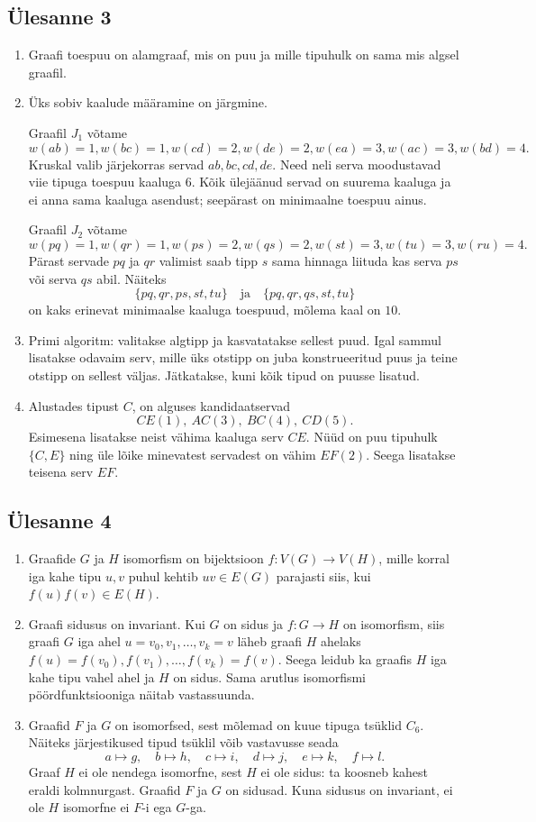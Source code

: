 \documentclass[11pt,a4paper]{article}
\newcommand{\yl}[1]{\subsection*{Ülesanne #1}}
\begin{document}
\yl{3}
\begin{enumerate}[label=\alph*.]
\item Graafi toespuu on alamgraaf, mis on puu ja mille tipuhulk on sama mis algsel graafil.
\item Üks sobiv kaalude määramine on järgmine.

Graafil $J_1$ võtame
\[
 w(ab)=1,
 w(bc)=1,
 w(cd)=2,
 w(de)=2,
 w(ea)=3,
 w(ac)=3,
 w(bd)=4.
\]
Kruskal valib järjekorras servad $ab,bc,cd,de$. Need neli serva moodustavad viie tipuga toespuu kaaluga $6$. Kõik ülejäänud servad on suurema kaaluga ja ei anna sama kaaluga asendust; seepärast on minimaalne toespuu ainus.

Graafil $J_2$ võtame
\[
 w(pq)=1,
 w(qr)=1,
 w(ps)=2,
 w(qs)=2,
 w(st)=3,
 w(tu)=3,
 w(ru)=4.
\]
Pärast servade $pq$ ja $qr$ valimist saab tipp $s$ sama hinnaga liituda kas serva $ps$ või serva $qs$ abil. Näiteks
\[
\{pq,qr,ps,st,tu\}
\quad\text{ja}\quad
\{pq,qr,qs,st,tu\}
\]
on kaks erinevat minimaalse kaaluga toespuud, mõlema kaal on $10$.
\item Primi algoritm: valitakse algtipp ja kasvatatakse sellest puud. Igal sammul lisatakse odavaim serv, mille üks otstipp on juba konstrueeritud puus ja teine otstipp on sellest väljas. Jätkatakse, kuni kõik tipud on puusse lisatud.
\item Alustades tipust $C$, on alguses kandidaatservad
\[
CE(1),\ AC(3),\ BC(4),\ CD(5).
\]
Esimesena lisatakse neist vähima kaaluga serv $CE$. Nüüd on puu tipuhulk $\{C,E\}$ ning üle lõike minevatest servadest on vähim $EF(2)$. Seega lisatakse teisena serv $EF$.
\end{enumerate}

\yl{4}
\begin{enumerate}[label=\alph*.]
\item Graafide $G$ ja $H$ isomorfism on bijektsioon $f:V(G)\to V(H)$, mille korral iga kahe tipu $u,v$ puhul kehtib $uv\in E(G)$ parajasti siis, kui $f(u)f(v)\in E(H)$.
\item Graafi sidusus on invariant. Kui $G$ on sidus ja $f:G\to H$ on isomorfism, siis graafi $G$ iga ahel $u=v_0,v_1,\ldots,v_k=v$ läheb graafi $H$ ahelaks $f(u)=f(v_0),f(v_1),\ldots,f(v_k)=f(v)$. Seega leidub ka graafis $H$ iga kahe tipu vahel ahel ja $H$ on sidus. Sama arutlus isomorfismi pöördfunktsiooniga näitab vastassuunda.
\item Graafid $F$ ja $G$ on isomorfsed, sest mõlemad on kuue tipuga tsüklid $C_6$. Näiteks järjestikused tipud tsüklil võib vastavusse seada
\[
a\mapsto g,
\quad b\mapsto h,
\quad c\mapsto i,
\quad d\mapsto j,
\quad e\mapsto k,
\quad f\mapsto l.
\]
Graaf $H$ ei ole nendega isomorfne, sest $H$ ei ole sidus: ta koosneb kahest eraldi kolmnurgast. Graafid $F$ ja $G$ on sidusad. Kuna sidusus on invariant, ei ole $H$ isomorfne ei $F$-i ega $G$-ga.
\end{enumerate}
\end{document}
